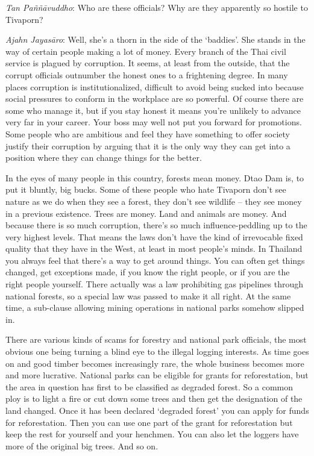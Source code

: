 \emph{Tan Paññāvuddho}: Who are these officials? Why are they apparently
so hostile to Tivaporn? 

\emph{Ajahn Jayasāro}: Well, she's a thorn in the side of the
`baddies'. She stands in the way of certain people making a lot of
money. Every branch of the Thai civil service is plagued by corruption. 
It seems, at least from the outside, that the corrupt officials
outnumber the honest ones to a frightening degree. In many places
corruption is institutionalized, difficult to avoid being sucked into
because social pressures to conform in the workplace are so powerful. Of
course there are some who manage it, but if you stay honest it means
you're unlikely to advance very far in your career. Your boss may well
not put you forward for promotions. Some people who are ambitious and
feel they have something to offer society justify their corruption by
arguing that it is the only way they can get into a position where they
can change things for the better. 

In the eyes of many people in this country, forests mean money. Dtao Dam
is, to put it bluntly, big bucks. Some of these people who hate Tivaporn
don't see nature as we do when they see a forest, they don't see
wildlife -- they see money in a previous existence. Trees are money. 
Land and animals are money. And because there is so much corruption, 
there's so much influence-peddling up to the very highest levels. That
means the laws don't have the kind of irrevocable fixed quality that
they have in the West, at least in most people's minds. In Thailand you
always feel that there's a way to get around things. You can often get
things changed, get exceptions made, if you know the right people, or if
you are the right people yourself. There actually was a law prohibiting
gas pipelines through national forests, so a special law was passed to
make it all right. At the same time, a sub-clause allowing mining
operations in national parks somehow slipped in. 

There are various kinds of scams for forestry and national park
officials, the most obvious one being turning a blind eye to the illegal
logging interests. As time goes on and good timber becomes increasingly
rare, the whole business becomes more and more lucrative. National parks
can be eligible for grants for reforestation, but the area in question
has first to be classified as degraded forest. So a common ploy is to
light a fire or cut down some trees and then get the designation of the
land changed. Once it has been declared `degraded forest' you can apply
for funds for reforestation. Then you can use one part of the grant for
reforestation but keep the rest for yourself and your henchmen. You can
also let the loggers have more of the original big trees. And so on. 

